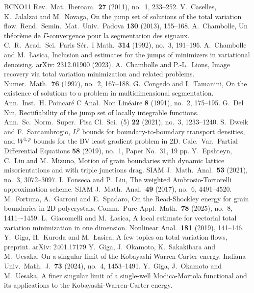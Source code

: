 \documentclass[11pt]{amsart} %
\numberwithin{equation}{section}
\begin{document}
\begin{thebibliography}{BCNO11}
Rev.\ Mat.\ Iberoam.\ {\bf27} (2011), no.\ 1, 233--252.
%
V.\ Caselles, K.\ Jalalzai and M.\ Novaga, 
On the jump set of solutions of the total variation flow. 
Rend.\ Semin.\ Mat.\ Univ.\ Padova {\bf130} (2013), 155--168.
%
A.\ Chambolle, 
Un th\'eor\`eme de $\Gamma$-convergence pour la segmentation des signaux. 
C.\ R.\ Acad.\ Sci.\ Paris S\'er.\ I Math.\ {\bf314} (1992), no.\ 3, 191--196.
%
A.\ Chambolle and M.\ \L asica, 
Inclusion and estimates for the jumps of minimizers in variational denoising. 
arXiv: 2312.01900 (2023).
%
A.\ Chambolle and P.-L.\ Lions, 
Image recovery via total variation minimization and related problems. 
Numer.\ Math.\ {\bf76} (1997), no.\ 2, 167--188.
%
G.\ Congedo and I.\ Tamanini, 
On the existence of solutions to a problem in multidimensional segmentation. 
Ann.\ Inst.\ H. Poincar\'e C Anal.\ Non Lin\'eaire {\bf8} (1991), no.\ 2, 175--195.
%
G.\ Del Nin, 
Rectifiability of the jump set of locally integrable functions. 
Ann.\ Sc.\ Norm.\ Super.\ Pisa Cl.\ Sci.\ (5) {\bf22} (2021), no.\ 3, 1233--1240.
%
S.\ Dweik and F.\ Santambrogio, 
$L^p$ bounds for boundary-to-boundary transport densities, and  $W^{1,p}$ bounds for the BV least gradient problem in 2D.
Calc.\ Var.\ Partial Differential Equations {\bf58} (2019), no.\ 1, Paper No.\ 31, 19 pp.
%
Y.\ Epshteyn, C.\ Liu and M.\ Mizuno, 
Motion of grain boundaries with dynamic lattice misorientations and with triple junctions drag. 
SIAM J.\ Math.\ Anal.\ {\bf53} (2021), no.\ 3, 3072--3097.
%
I.\ Fonseca and P.\ Liu, 
The weighted Ambrosio-Tortorelli approximation scheme. 
SIAM J.\ Math.\ Anal.\ {\bf49} (2017), no.\ 6, 4491--4520.
%
M.\ Fortuna, A.\ Garroni and E.\ Spadaro, 
On the Read-Shockley energy for grain boundaries in 2D polycrystals. Comm.\ Pure Appl.\ Math.\ {\bf78} (2025), no.\ 8, 1411–-1459.
%
L.\ Giacomelli and M.\ \L asica, 
A local estimate for vectorial total variation minimization in one dimension. 
Nonlinear Anal.\ {\bf181} (2019), 141--146.
% 
Y.\ Giga, H.\ Kuroda and M.\ \L asica, 
A few topics on total variation flows, preprint. 
arXiv: 2401.17179
%
Y.\ Giga, J.\ Okamoto, K.\ Sakakibara and M.\ Uesaka, 
On a singular limit of the Kobayashi-Warren-Carter energy. 
Indiana Univ.\ Math.\ J.\ {\bf73} (2024), no.\ 4, 1453--1491.
%
Y.\ Giga, J.\ Okamoto and M.\ Uesaka, 
A finer singular limit of a single-well Modica-Mortola functional and its applications to the Kobayashi-Warren-Carter energy. 

\end{thebibliography}
\end{document}
